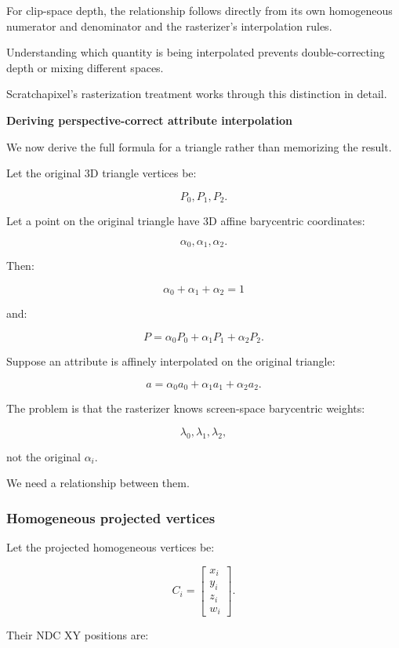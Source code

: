 For clip-space depth, the relationship follows directly from its own homogeneous numerator and denominator and the rasterizer's interpolation rules.

Understanding which quantity is being interpolated prevents double-correcting depth or mixing different spaces.

Scratchapixel's rasterization treatment works through this distinction in detail. 

\textbf{Deriving perspective-correct attribute interpolation}

We now derive the full formula for a triangle rather than memorizing the result.

Let the original 3D triangle vertices be:

\[
 P_0,P_1,P_2.
\]

Let a point on the original triangle have 3D affine barycentric coordinates:

\[
 \alpha_0,\alpha_1,\alpha_2.
\]

Then:

\[
 \boxed{ \alpha_0+\alpha_1+\alpha_2=1 }
\]

and:

\[
 \boxed{ P=\alpha_0P_0+\alpha_1P_1+\alpha_2P_2 }.
\]

Suppose an attribute is affinely interpolated on the original triangle:

\[
 \boxed{ a=\alpha_0a_0+\alpha_1a_1+\alpha_2a_2 }.
\]

The problem is that the rasterizer knows screen-space barycentric weights:

\[
 \lambda_0,\lambda_1,\lambda_2,
\]

not the original \(\alpha_i\).

We need a relationship between them.

\subsubsection{Homogeneous projected vertices}\label{homogeneous-projected-vertices}

Let the projected homogeneous vertices be:

\[
 C_i= \begin{bmatrix} x_i\\y_i\\z_i\\w_i \end{bmatrix}.
\]

Their NDC XY positions are:

